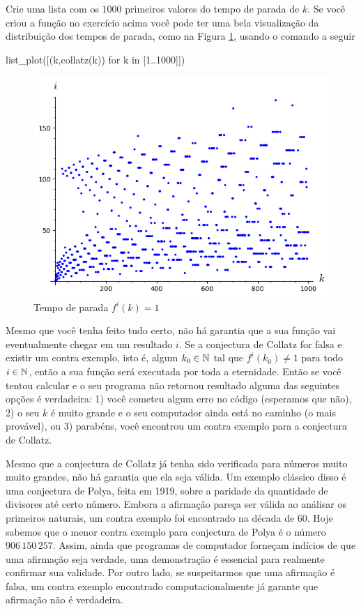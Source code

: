 \begin{exercise}
  Crie uma lista com os $1000$ primeiros valores do tempo
  de parada de $k$. Se você criou a função  no
  exercício acima você pode ter uma bela visualização da distribuição
  dos tempos de parada, como
  na Figura \ref{img:collatz}, usando o comando a seguir
\end{exercise}
\begin{sageinput}
list_plot([(k,collatz(k)) for k in [1..1000]])
\end{sageinput}
\begin{figure}[h]
  \centering
  \includegraphics[scale=0.7]{imgs/collatz.png}
  \caption{Tempo de parada $f^i(k) = 1$}
  \label{img:collatz}
\end{figure}
  

Mesmo que você tenha feito tudo certo, não há garantia que
a sua função  vai eventualmente chegar em um
resultado $i$. Se a conjectura de Collatz for falsa e existir
um contra exemplo, isto é, algum $k_0 \in \mathbb{N}$ tal que
$f^i(k_0) \neq 1$ para todo $i \in \mathbb{N}$, então a sua função
será executada por toda a eternidade. Então se você tentou calcular
 e o seu programa não retornou resultado
alguma das seguintes opções é verdadeira: 1) você cometeu
algum erro no código (esperamos que não), 2) o seu $k$ é
muito grande e o seu computador ainda está no caminho
(o mais provável), ou 3) parabéns, você encontrou um contra
exemplo para a conjectura de Collatz.

Mesmo que a conjectura de Collatz já tenha sido verificada para
números muito muito grandes, não há garantia que ela seja válida.
Um exemplo clássico disso é uma conjectura de Polya, feita
em 1919, sobre
a paridade da quantidade de divisores até certo número. Embora
a afirmação pareça ser válida ao análisar os
primeiros naturais, um contra exemplo foi encontrado na década
de 60. Hoje sabemos que o menor contra exemplo 
para conjectura de Polya é o número $906\,150\,257$.
Assim, ainda que programas de computador forneçam indícios de
que uma afirmação seja verdade, uma demonstração
é essencial para realmente confirmar sua validade.
Por outro lado, se suspeitarmos que uma afirmação é falsa, 
um contra exemplo encontrado computacionalmente
já garante que afirmação não é verdadeira.


